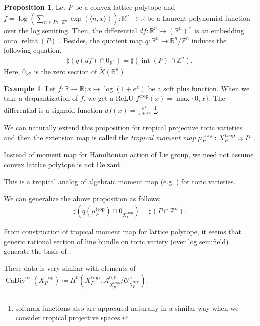 \documentclass[a4paper,dvipdfmx,reqno,12pt]{amsart}
\theoremstyle{definition}
\newtheorem{Eg}[Thm]{Example}
\newtheorem{Prop}[Thm]{Proposition}
\newcommand{\deq}{\coloneqq}
\newcommand{\R}{\mathbb{R}}%
\newcommand{\Z}{\mathbb{Z}}%
\newcommand{\mcal}[1]{\mathcal{#1}}%
\newcommand{\opn}[1]{\operatorname{#1}}
\newcommand{\abk}[1]{\langle {#1} \rangle}%
\newcommand{\simto}{ 
\mathrel{\raisebox{0.13em}{${\sim}$}}
\kern -0.75em \mathrel{\raisebox{-0.11em}{${\scriptstyle \to}$}}  
}
\numberwithin{equation}{section}
\begin{document}
\begin{Prop}
Let $P$ be a convex lattice polytope and
$f=\log (\sum_{n\in P\cap \Z^{n}} \opn{exp}(\abk{n,x}))\colon \R^{n}\to \R$ be 
a Laurent polynomial function over the log semiring. Then,
 the differential
$df:\R^{n}\to (\R^{n})^{\vee}$ is an embedding onto $\opn{relint}(P)$
\cite[p.124 Exercise]{MR1301331}.
Besides, the quotient map $q: \R^{n}\to \R^{n}/\Z^{n}$ induces the following
equation.
\begin{align}
\sharp (q(df)\cap 0_{\R^{n}})=\sharp (\opn{int}(P)\cap \Z^{n}). 
\end{align}
Here, $0_{{\R}^{n}}$ is the zero section of $\check{X}(\R^{n})$.
\end{Prop}

\begin{Eg}
Let $f:\R \to \R; x\mapsto \log (1+e^{x})$ be a soft 
plus function. When we take a dequantization of $f$,
we get a ReLU $f^{\opn{trop}}(x)=\max\{0,x\}$.
The differential is a sigmoid function 
$df(x)=\frac{e^{x}}{1+e^{x}}$ 
\footnote{softmax functions also are appreared 
naturally in a similar way when we consider tropical projective spaces.}.
\end{Eg}

We can naturally extend this proposition for tropical projective toric 
varieties and then the extension map is called the \emph{tropical moment map}
$\mu_{P}^{\opn{trop}}: X_{P}^{\opn{trop}}\simto P$ 
\cite[Definition 2.1 (2)]{MR2428356}.

Instead of moment map for Hamiltonian action of Lie group, we
need not assume convex lattice polytope is not Delzant.

This is a tropical analog of algebraic moment map 
(e.g. \cite[]{coxToricVarieties2011a}) for toric varieties.

We can generalize the above proposition as follows;
\begin{align}
\sharp (q(\mu_P^{\opn{trop}}) \cap 0_{X_P^{\opn{trop}}})
=\sharp (P \cap \Z^{n}).
\end{align}

From construction of tropical moment map for lattice polytope,
it seems that generic rational section of line bundle on 
toric variety (over log semifield) generate the basis of
.


These data is very similar with elements of 
$\opn{CaDiv}^{\infty}(X_{P}^{\opn{trop}})\deq H^{0}(X_{P}^{\opn{trop}};
\mcal{A}^{0,0}_{X_{P}^{\opn{trop}}}/\mathcal{O}^{\times}_{X_{P}^{\opn{trop}}})$.
\end{document}
